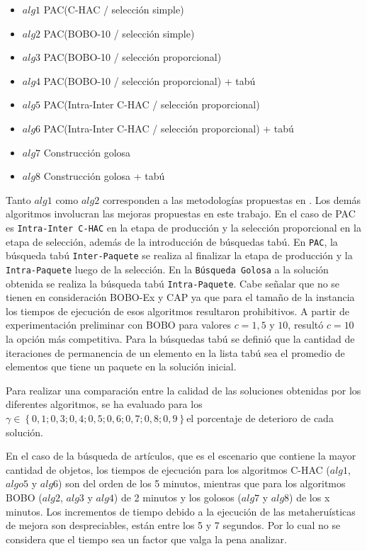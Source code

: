 \begin{itemize}
\item{$alg1$} PAC(C-HAC / selección simple)
\item{$alg2$} PAC(BOBO-10 / selección simple)
\item{$alg3$} PAC(BOBO-10 / selección proporcional)
\item{$alg4$} PAC(BOBO-10 / selección proporcional) + tabú
\item{$alg5$} PAC(Intra-Inter C-HAC / selección proporcional)
\item{$alg6$} PAC(Intra-Inter C-HAC / selección proporcional) + tabú
\item{$alg7$} Construcción golosa
\item{$alg8$} Construcción golosa + tabú
\end{itemize}

Tanto $alg1$ como $alg2$ corresponden a las metodologías propuestas en \cite{compositeRetrival}. Los demás algoritmos involucran las mejoras propuestas en este trabajo. En el caso de PAC es \texttt{Intra-Inter C-HAC} en la etapa de producción y la selección proporcional en la etapa de selección, además de la introducción de búsquedas tabú. En \texttt{PAC}, la búsqueda tabú \texttt{Inter-Paquete} se realiza al finalizar la etapa de producción y la \texttt{Intra-Paquete} luego de la selección. En la \texttt{Búsqueda Golosa} a la solución obtenida se realiza la búsqueda tabú \texttt{Intra-Paquete}. Cabe señalar que no se tienen en consideración BOBO-Ex y CAP ya que para el tamaño de la instancia los tiempos de ejecución de esos algoritmos resultaron prohibitivos. A partir de experimentación preliminar con BOBO para valores $c=1, 5$ y $10$, resultó $c=10$ la opción más competitiva. Para la búsquedas tabú se definió que la cantidad de iteraciones de permanencia de un elemento en la lista tabú sea el promedio de elementos que tiene un paquete en la solución inicial.

Para realizar una comparación entre la calidad de las soluciones obtenidas por los diferentes algoritmos, se ha evaluado para los $\gamma \in \left\{0,1; 0,3; 0,4; 0,5; 0,6; 0,7; 0,8; 0,9\right\} $el porcentaje de deterioro de cada solución.

En el caso de la búsqueda de artículos, que es el escenario que contiene la mayor cantidad de objetos, los tiempos de ejecución  para los algoritmos C-HAC ($alg1$, $algo5$ y $alg6$) son del orden de los 5 minutos, mientras que para los algoritmos BOBO ($alg2$, $alg3$ y $alg4$) de 2 minutos y los golosos ($alg7$ y $alg8$) de los x minutos. Los incrementos de tiempo debido a la ejecución de las metaheruísticas de mejora son despreciables, están entre los 5 y 7 segundos. Por lo cual no se considera que el tiempo sea un factor que valga la pena analizar.

